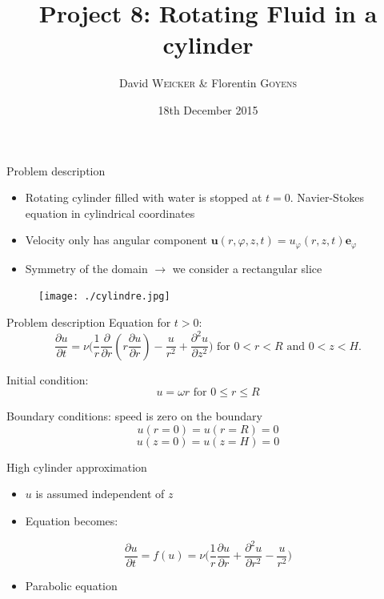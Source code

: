 \documentclass{beamer}
\title[Project SF2520]{Project 8: Rotating Fluid in a cylinder}
\author{David \textsc{Weicker} \& Florentin \textsc{Goyens} }
\institute{KTH}
\date{18th December 2015}
\newcommand{\dr}{\partial}
\begin{document}
\begin{frame}
\titlepage
\end{frame}


\begin{frame}{Problem description}

\begin{itemize}
\item Rotating cylinder filled with water is stopped at $t=0$. Navier-Stokes equation in cylindrical coordinates 
\item Velocity only has angular component $\textbf{u}(r,\varphi,z,t)=u_{\varphi}(r,z,t)\textbf{e}_{\varphi}$
\item Symmetry of the domain $\rightarrow$ we consider a rectangular slice 
\end{itemize}

\begin{figure}[!h]
\centering
\texttt{[image: ./cylindre.jpg]}
\end{figure}

\end{frame}

\begin{frame}{Problem description}
Equation for $t>0$:
$$\dfrac{\dr u}{\dr t}= \nu\Big(\frac{1}{r}\frac{\dr}{\dr r}(r\frac{\dr u}{\dr r}) - \frac{u}{r^2} + \frac{\dr^2 u}{\dr z^2}\Big) \text{ for } 0<r<R \text{ and } 0<z<H.$$

Initial condition: 
$$u = \omega r \text{ for } 0\leq r \leq R$$

Boundary conditions: speed is zero on the boundary
$$u(r = 0) = u(r = R) = 0$$
$$u(z=0)= u(z=H) = 0$$
\end{frame}

\begin{frame}{High cylinder approximation}
\begin{itemize}
\item $u$ is assumed independent of $z$
\item Equation becomes:
\end{itemize}
$$\dfrac{\dr u}{\dr t}= f(u)= \nu\Big(\frac{1}{r}\frac{\dr u}{\dr r} + \frac{\dr^2 u}{\dr r^2} - \frac{u}{r^2}\Big)$$
\begin{itemize}
\item Parabolic equation %
\end{itemize}
\end{frame}
\end{document}
